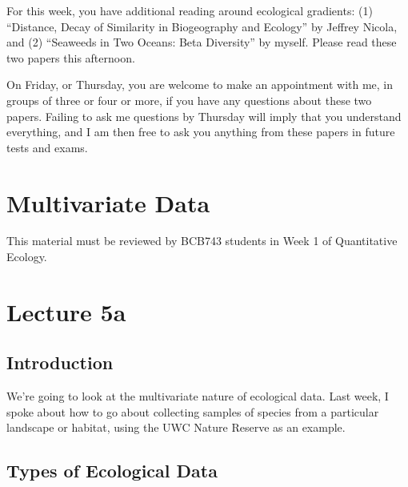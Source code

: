 \documentclass[
  12pt,
]{book}
\begin{document}
For this week, you have additional reading around ecological gradients:
(1) ``Distance, Decay of Similarity in Biogeography and Ecology'' by
Jeffrey Nicola, and (2) ``Seaweeds in Two Oceans: Beta Diversity'' by
myself. Please read these two papers this afternoon.

On Friday, or Thursday, you are welcome to make an appointment with me,
in groups of three or four or more, if you have any questions about
these two papers. Failing to ask me questions by Thursday will imply
that you understand everything, and I am then free to ask you anything
from these papers in future tests and exams.

\chapter{Multivariate Data}\label{sec-lect5}

\begin{tcolorbox}[enhanced jigsaw, opacityback=0, left=2mm, colframe=quarto-callout-note-color-frame, breakable, rightrule=.15mm, opacitybacktitle=0.6, titlerule=0mm, bottomrule=.15mm, title=\textcolor{quarto-callout-note-color}{\faInfo}\hspace{0.5em}{BCB743}, coltitle=black, bottomtitle=1mm, colback=white, colbacktitle=quarto-callout-note-color!10!white, toptitle=1mm, arc=.35mm, leftrule=.75mm, toprule=.15mm]

This material must be reviewed by BCB743 students in Week 1 of
Quantitative Ecology.

\end{tcolorbox}

\chapter*{Lecture 5a}\label{lecture-5a}

\section{Introduction}\label{introduction}

We're going to look at the multivariate nature of ecological data. Last
week, I spoke about how to go about collecting samples of species from a
particular landscape or habitat, using the UWC Nature Reserve as an
example.

\section{Types of Ecological Data}\label{types-of-ecological-data}
\end{document}
